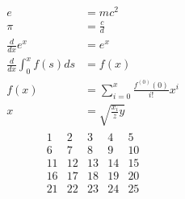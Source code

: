 \documentclass[a4paper,12pt]{report}
\begin{document}
\begin{align}
e &= mc^2 \\
\pi &= \frac{c}{d} \\
\frac{d}{dx}e^x &= e^x \\
\frac{d}{dx} \int_0^x f(s) ds &= f(x) \\
f(x) &= \sum_{i=0}^{x} \frac{f^{(0)}(0)}{i!} x^i \\
x &= \sqrt{\frac{x_i}{z} y}
\end{align}
\begin{align}
\begin{matrix}
1 & 2 & 3 & 4 & 5 \\
6 & 7 & 8 & 9 & 10 \\
11 & 12 & 13 & 14 & 15 \\
16 & 17 & 18 & 19 & 20 \\
21 & 22 & 23 & 24 & 25 \\
\end{matrix}
\end{align}
\end{document}
